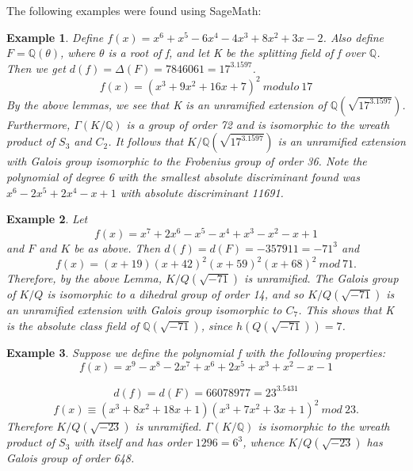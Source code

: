 \documentclass[preprint,12pt,reqno]{elsarticle}
\newtheorem{example}{Example}
\begin{document}
The following examples were found using SageMath:
\begin{example}
Define $f(x)=x^6 + x^5 - 6x^4 - 4x^3 + 8x^2 + 3x - 2$. Also define $F=\mathbb{Q}(\theta)$, where $\theta$ is a root of f, and let K be the splitting field of f over $\mathbb{Q}$. Then we get $d(f)=\Delta(F)=7846061=17^3.1597$. 
\begin{equation}
   f(x)= (x^3 + 9x^2 + 16x + 7)^2\:modulo\:17
\end{equation}
By the above lemmas, we see that K is an unramified extension of $\mathbb{Q}(\sqrt{17^3.1597})$. Furthermore, $\Gamma(K/\mathbb{Q})$ is a group of order 72 and is isomorphic to the wreath product of $S_3$ and $C_2$. It follows that $K/\mathbb{Q}(\sqrt{17^3.1597})$ is an unramified extension with Galois group isomorphic to the Frobenius group of order 36.
Note the polynomial of degree 6 with the smallest absolute discriminant found was $x^6 - 2x^5 + 2x^4 - x + 1$ with absolute discriminant 11691.
\end{example}
\begin{example}
 Let \begin{equation}
     f(x)=x^7 + 2x^6 - x^5 - x^4 + x^3 - x^2 - x + 1
 \end{equation}and $F$ and $K$ be as above.
Then $d(f)=d(F)=-357911=-71^{3}$ and
\begin{equation}
    f(x)=(x + 19)(x + 42)^2 (x + 59)^2(x + 68)^2\:mod\:71.
\end{equation}
Therefore, by the above Lemma, $K/Q(\sqrt{-71})$ is unramified. The Galois group of $K/Q$
is isomorphic to a dihedral group of order 14, and so $K/Q(\sqrt{-71})$
is an unramified extension with Galois group isomorphic to $C_7$.
This shows that K is the absolute class field of $\mathbb{Q}(\sqrt{-71})$, since $h(Q(\sqrt{-71}))=7$.
\end{example}
\begin{example}
    Suppose we define the polynomial f with the following properties: \begin{equation}
        f(x) =x^9 - x^8 - 2x^7 + x^6 + 2x^5 + x^3 + x^2 - x - 1
    \end{equation} \par
    \begin{equation}
        d(f)=d(F)=66078977=23^3.5431
    \end{equation} 
    \begin{equation}
        f(x)\equiv(x^3 + 8x^2 + 18x + 1)(x^3 + 7x^2 + 3x + 1)^2\:mod\:23.
    \end{equation}
Therefore  $K/Q(\sqrt{-23})$ is unramified. $\Gamma(K/\mathbb{Q})$ is isomorphic to the wreath product of $S_3$ with itself and has order $1296=6^3$, whence $K/Q(\sqrt{-23})$ has Galois group of order 648.
\end{example}
\end{document}
